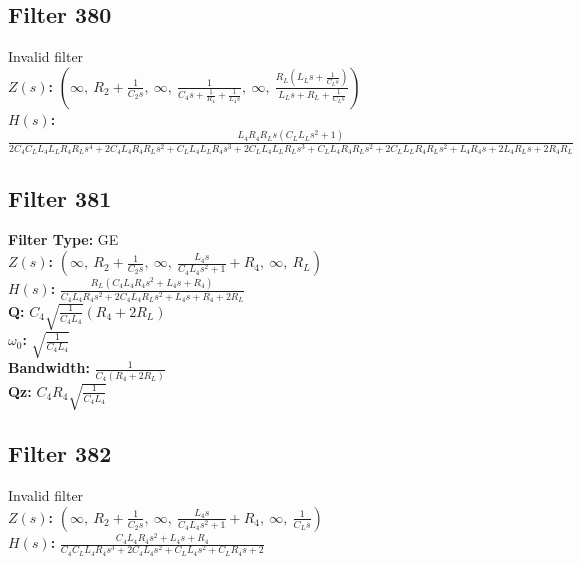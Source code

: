 \documentclass{article}
\begin{document}
\subsection*{Filter 380}
Invalid filter \\ 
\textbf{$Z(s)$:} $\left( \infty, \  R_{2} + \frac{1}{C_{2} s}, \  \infty, \  \frac{1}{C_{4} s + \frac{1}{R_{4}} + \frac{1}{L_{4} s}}, \  \infty, \  \frac{R_{L} \left(L_{L} s + \frac{1}{C_{L} s}\right)}{L_{L} s + R_{L} + \frac{1}{C_{L} s}}\right)$ \\ 
\textbf{$H(s)$:} $\frac{L_{4} R_{4} R_{L} s \left(C_{L} L_{L} s^{2} + 1\right)}{2 C_{4} C_{L} L_{4} L_{L} R_{4} R_{L} s^{4} + 2 C_{4} L_{4} R_{4} R_{L} s^{2} + C_{L} L_{4} L_{L} R_{4} s^{3} + 2 C_{L} L_{4} L_{L} R_{L} s^{3} + C_{L} L_{4} R_{4} R_{L} s^{2} + 2 C_{L} L_{L} R_{4} R_{L} s^{2} + L_{4} R_{4} s + 2 L_{4} R_{L} s + 2 R_{4} R_{L}}$ \\ 
\subsection*{Filter 381}
\textbf{Filter Type:} GE \\ 
\textbf{$Z(s)$:} $\left( \infty, \  R_{2} + \frac{1}{C_{2} s}, \  \infty, \  \frac{L_{4} s}{C_{4} L_{4} s^{2} + 1} + R_{4}, \  \infty, \  R_{L}\right)$ \\ 
\textbf{$H(s)$:} $\frac{R_{L} \left(C_{4} L_{4} R_{4} s^{2} + L_{4} s + R_{4}\right)}{C_{4} L_{4} R_{4} s^{2} + 2 C_{4} L_{4} R_{L} s^{2} + L_{4} s + R_{4} + 2 R_{L}}$ \\ 
\textbf{Q:} $C_{4} \sqrt{\frac{1}{C_{4} L_{4}}} \left(R_{4} + 2 R_{L}\right)$ \\ 
\textbf{$\omega_0$:} $\sqrt{\frac{1}{C_{4} L_{4}}}$ \\ 
\textbf{Bandwidth:} $\frac{1}{C_{4} \left(R_{4} + 2 R_{L}\right)}$ \\ 
\textbf{Qz:} $C_{4} R_{4} \sqrt{\frac{1}{C_{4} L_{4}}}$ \\ 
\subsection*{Filter 382}
Invalid filter \\ 
\textbf{$Z(s)$:} $\left( \infty, \  R_{2} + \frac{1}{C_{2} s}, \  \infty, \  \frac{L_{4} s}{C_{4} L_{4} s^{2} + 1} + R_{4}, \  \infty, \  \frac{1}{C_{L} s}\right)$ \\ 
\textbf{$H(s)$:} $\frac{C_{4} L_{4} R_{4} s^{2} + L_{4} s + R_{4}}{C_{4} C_{L} L_{4} R_{4} s^{3} + 2 C_{4} L_{4} s^{2} + C_{L} L_{4} s^{2} + C_{L} R_{4} s + 2}$ \\ 
\end{document}
